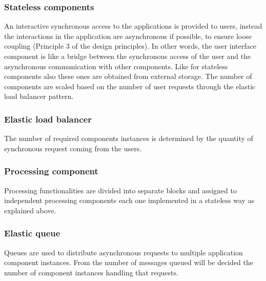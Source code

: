 \subsubsection{Stateless components}
An interactive synchronous access to the applications is provided to users, instead the interactions in the application are asynchronous if possible, to ensure loose coupling (Principle 3 of the design principles).
In other words, the user interface component is like a bridge between the synchronous access of the user and the asynchronous communication with other components. Like for stateless components also these ones are obtained from external storage.
The number of components are scaled based on the number of user requests through the elastic load balancer pattern.

\subsubsection{Elastic load balancer}
The number of required components instances is determined by the quantity of synchronous request coming from the users.

\subsubsection{Processing component}
Processing functionalities are divided into separate blocks and assigned to independent processing components each one implemented in a stateless way as explained above.

\subsubsection{Elastic queue}
Queues are used to distribute asynchronous requests to multiple application component instances. From the number of messages queued will be decided the number of component instances handling that requests.

\begin{center}
\end{center}

